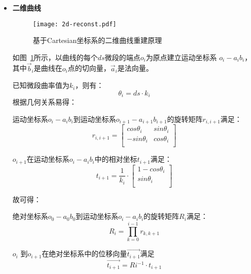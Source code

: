 \begin{itemize}

\item \textbf{二维曲线} \\

\begin{figure}[H]
\centering
\texttt{[image: 2d-reconst.pdf]}
\caption{基于Cartesian坐标系的二维曲线重建原理}
\label{fig:2d-reconst} 
\end{figure}

如图~\ref{fig:2d-reconst}所示，以曲线的每个$ds$微段的端点$o_i$为原点建立运动坐标系 $o_i-a_ib_i$，
其中$\vec b_i$是曲线在$o_i$点的切向量，$\vec a_i$是法向量。

已知微段曲率值为$k_i$，则有：
\begin{equation}
\theta_i = ds\cdot k_i
\end{equation}
根据几何关系易得：

运动坐标系$o_i-a_ib_i$到运动坐标系$o_{i+1}-a_{i+1}b_{i+1}$的旋转矩阵$r_{i, i+1}$满足：
    \begin{equation}
    r_{i, i+1} = \left[
      \begin{matrix}
      cos \theta_i & sin \theta_i\\
      -sin \theta_i & cos \theta_i\\
      \end{matrix}
    \right]
    \end{equation}
    
$o_{i+1}$在运动坐标系$o_i-a_ib_i$中的相对坐标$t_{i+1}$满足：
    \begin{equation}
    t_{i+1} = \frac{1}{k_i} \cdot \left[
      \begin{matrix}
    	1 - cos\theta_i\\
      sin\theta_i\\
      \end{matrix}
    \right]
    \end{equation}
    

故可得：

绝对坐标系$o_0-a_0b_0$到运动坐标系$o_i-a_ib_i$的旋转矩阵$R_i$满足：
    \begin{equation}
    R_i = \prod_{k = 0}^{i-1} r_{k, k+1}
    \end{equation}

$o_i$ 到$o_{i+1}$在绝对坐标系中的位移向量$\vec{t_{i+1}}$满足
    \begin{equation}
    \vec{t_{i+1}} = Ri^{-1}\cdot t_{i+1}
    \end{equation}
    

\end{itemize}
